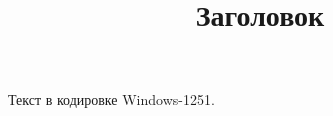 \documentclass[11pt,a4paper]{article}
\title{Заголовок}
\begin{document}
\maketitle

Текст в кодировке Windows-1251.
\end{document}
